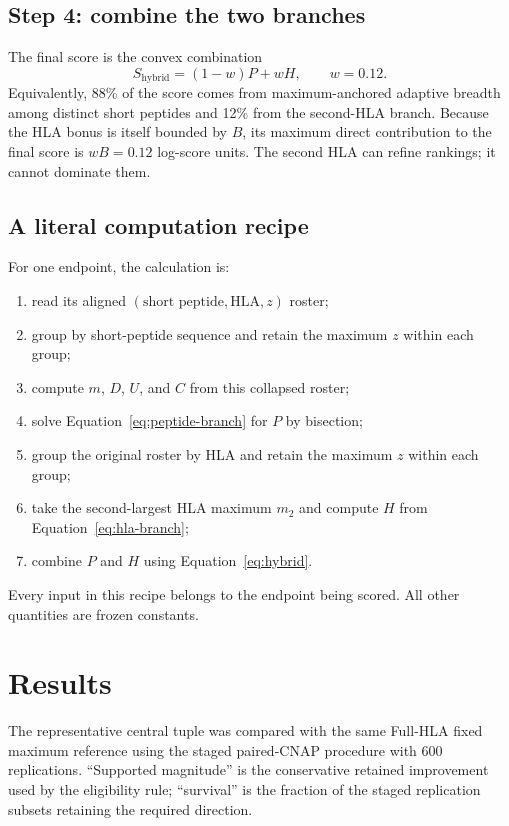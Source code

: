 \documentclass[11pt]{article}
\begin{document}
\subsection{Step 4: combine the two branches}

The final score is the convex combination
\begin{equation}
\boxed{
S_{\mathrm{hybrid}}=(1-w)P+wH,
\qquad w=0.12.
}
\label{eq:hybrid}
\end{equation}
Equivalently, 88\% of the score comes from maximum-anchored adaptive breadth
among distinct short peptides and 12\% from the second-HLA branch. Because the
HLA bonus is itself bounded by $B$, its maximum direct contribution to the
final score is $wB=0.12$ log-score units. The second HLA can refine rankings;
it cannot dominate them.

\subsection{A literal computation recipe}

For one endpoint, the calculation is:
\begin{enumerate}
  \item read its aligned $(\text{short peptide},\text{HLA},z)$ roster;
  \item group by short-peptide sequence and retain the maximum $z$ within each
  group;
  \item compute $m$, $D$, $U$, and $C$ from this collapsed roster;
  \item solve Equation~\eqref{eq:peptide-branch} for $P$ by bisection;
  \item group the original roster by HLA and retain the maximum $z$ within
  each group;
  \item take the second-largest HLA maximum $m_2$ and compute $H$ from
  Equation~\eqref{eq:hla-branch};
  \item combine $P$ and $H$ using Equation~\eqref{eq:hybrid}.
\end{enumerate}
Every input in this recipe belongs to the endpoint being scored. All other
quantities are frozen constants.

\section{Results}

The representative central tuple was compared with the same Full-HLA fixed
maximum reference using the staged paired-CNAP procedure with 600
replications. ``Supported magnitude'' is the conservative retained improvement
used by the eligibility rule; ``survival'' is the fraction of the staged
replication subsets retaining the required direction.
\end{document}
